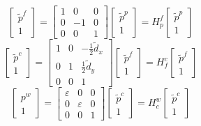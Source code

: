 \documentclass[12pt, a4paper]
{article}
\providecommand{\tp}{\tilde{p}}
\providecommand{\inert}{w}
\begin{document}
\begin{equation}
\begin{bmatrix}
\tp^f\\
1
\end{bmatrix} = \begin{bmatrix}
1 & 0 & 0\\
0 & -1 & 0\\
0& 0 & 1
\end{bmatrix}\begin{bmatrix}
\tp^p\\1
\end{bmatrix}=H^f_p \begin{bmatrix}
\tp^p\\1
\end{bmatrix}
\end{equation}
\begin{equation}
\begin{bmatrix}
\tp^c\\
1
\end{bmatrix} = \begin{bmatrix}
1 & 0 & -\frac{1}{2}\tilde{d}_x\\
0 & 1 & \frac{1}{2}\tilde{d}_y\\
0& 0 & 1
\end{bmatrix}\begin{bmatrix}
\tp^f\\1
\end{bmatrix}=H^c_f \begin{bmatrix}
\tp^f\\1
\end{bmatrix}
\end{equation}
\begin{equation}
\begin{bmatrix}
p^{\inert}\\
1
\end{bmatrix} = \begin{bmatrix}
\varepsilon & 0 & 0\\
0 & \varepsilon & 0\\
0& 0 & 1
\end{bmatrix}\begin{bmatrix}
\tp^c\\1
\end{bmatrix}=H^{\inert}_c \begin{bmatrix}
\tp^c\\1
\end{bmatrix}
\end{equation}
\end{document}
